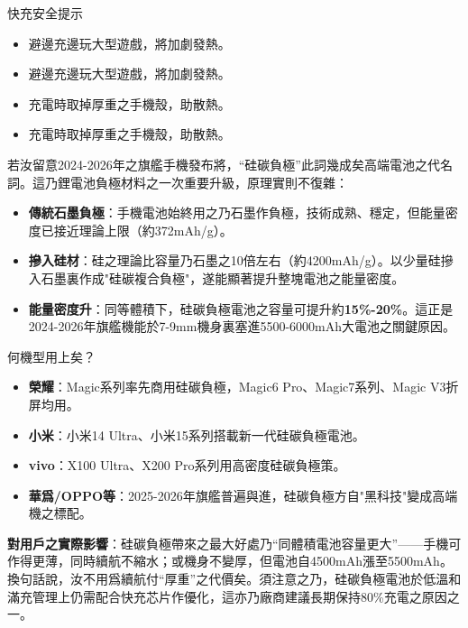 \begin{tcbwarn}{快充安全提示}
\begin{itemize}
  \item 避邊充邊玩大型遊戲，將加劇發熱。
  \item 避邊充邊玩大型遊戲，將加劇發熱。
  \item 充電時取掉厚重之手機殼，助散熱。
  \item 充電時取掉厚重之手機殼，助散熱。
\end{itemize}

\end{tcbwarn}


若汝留意2024-2026年之旗艦手機發布將，“硅碳負極”此詞幾成矣高端電池之代名詞。這乃鋰電池負極材料之一次重要升級，原理實則不復雜：

\begin{itemize}
  \item \textbf{傳統石墨負極}：手機電池始終用之乃石墨作負極，技術成熟、穩定，但能量密度已接近理論上限（約372mAh/g）。
  \item \textbf{摻入硅材}：硅之理論比容量乃石墨之10倍左右（約4200mAh/g）。以少量硅摻入石墨裏作成"硅碳複合負極"，遂能顯著提升整塊電池之能量密度。
  \item \textbf{能量密度升}：同等體積下，硅碳負極電池之容量可提升約\textbf{15\%-20\%}。這正是2024-2026年旗艦機能於7-9mm機身裏塞進5500-6000mAh大電池之關鍵原因。
\end{itemize}

\begin{tcbinfo}{何機型用上矣？}
\begin{itemize}
  \item \textbf{榮耀}：Magic系列率先商用硅碳負極，Magic6 Pro、Magic7系列、Magic V3折屏均用。
  \item \textbf{小米}：小米14 Ultra、小米15系列搭載新一代硅碳負極電池。
  \item \textbf{vivo}：X100 Ultra、X200 Pro系列用高密度硅碳負極策。
  \item \textbf{華爲/OPPO等}：2025-2026年旗艦普遍與進，硅碳負極方自"黑科技"變成高端機之標配。
\end{itemize}

\end{tcbinfo}

\textbf{對用戶之實際影響}：硅碳負極帶來之最大好處乃“同體積電池容量更大”——手機可作得更薄，同時續航不縮水；或機身不變厚，但電池自4500mAh漲至5500mAh。換句話說，汝不用爲續航付“厚重”之代價矣。須注意之乃，硅碳負極電池於低溫和滿充管理上仍需配合快充芯片作優化，這亦乃廠商建議長期保持80\%充電之原因之一。

